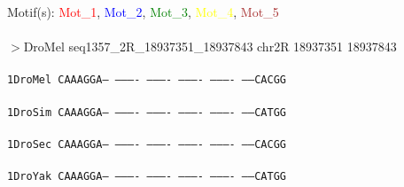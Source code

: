 \documentclass[11pt,twoside,reqno,a4paper]{article}
\begin{document}
\noindent
\newlength{\charwidth}Motif(s): \textcolor{Red}{Mot\_1}, \textcolor{Blue}{Mot\_2}, \textcolor{Green}{Mot\_3}, \textcolor{Yellow}{Mot\_4}, \textcolor{Brown}{Mot\_5}\\
\\
$>$DroMel	seq1357\_2R\_18937351\_18937843	chr2R	18937351	18937843 \\
 \\
\texttt{1\hspace*{3\charwidth}DroMel	CAAAGGA---	----------	----------	----------	----------	-----CACGG	\\
\hspace*{4\charwidth}\hspace*{7\charwidth}\hspace*{1\charwidth}\hspace*{1\charwidth}\hspace*{1\charwidth}\hspace*{1\charwidth}\hspace*{1\charwidth}\hspace*{1\charwidth}\\
1\hspace*{3\charwidth}DroSim	CAAAGGA---	----------	----------	----------	----------	-----CATGG	\\
\hspace*{4\charwidth}\hspace*{7\charwidth}\hspace*{1\charwidth}\hspace*{1\charwidth}\hspace*{1\charwidth}\hspace*{1\charwidth}\hspace*{1\charwidth}\hspace*{1\charwidth}\\
1\hspace*{3\charwidth}DroSec	CAAAGGA---	----------	----------	----------	----------	-----CACGG	\\
\hspace*{4\charwidth}\hspace*{7\charwidth}\hspace*{1\charwidth}\hspace*{1\charwidth}\hspace*{1\charwidth}\hspace*{1\charwidth}\hspace*{1\charwidth}\hspace*{1\charwidth}\\
1\hspace*{3\charwidth}DroYak	CAAAGGA---	----------	----------	----------	----------	-----CATGG	\\
}
\end{document}
